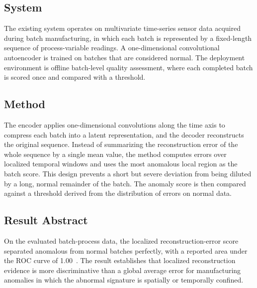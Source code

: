 \documentclass[conference]{IEEEtran}
\begin{document}
\subsection{System}
The existing system operates on multivariate time-series sensor data acquired during batch manufacturing, in which each batch is represented by a fixed-length sequence of process-variable readings. A one-dimensional convolutional autoencoder is trained on batches that are considered normal. The deployment environment is offline batch-level quality assessment, where each completed batch is scored once and compared with a threshold.

\subsection{Method}
The encoder applies one-dimensional convolutions along the time axis to compress each batch into a latent representation, and the decoder reconstructs the original sequence. Instead of summarizing the reconstruction error of the whole sequence by a single mean value, the method computes errors over localized temporal windows and uses the most anomalous local region as the batch score. This design prevents a short but severe deviation from being diluted by a long, normal remainder of the batch. The anomaly score is then compared against a threshold derived from the distribution of errors on normal data.

\subsection{Result Abstract}
On the evaluated batch-process data, the localized reconstruction-error score separated anomalous from normal batches perfectly, with a reported area under the ROC curve of 1.00~\cite{gorman2023}. The result establishes that localized reconstruction evidence is more discriminative than a global average error for manufacturing anomalies in which the abnormal signature is spatially or temporally confined.
\end{document}
